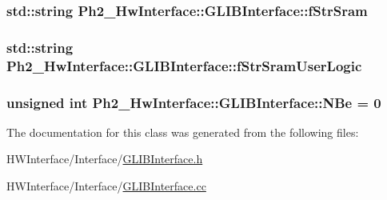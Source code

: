 \hypertarget{class_ph2___hw_interface_1_1_g_l_i_b_interface_ac9b1a3d2dd2e8fc4e12f13ed8f985699}{
\subsubsection[{f\-Str\-Sram}]{\setlength{\rightskip}{0pt plus 5cm}std\-::string Ph2\-\_\-\-Hw\-Interface\-::\-G\-L\-I\-B\-Interface\-::f\-Str\-Sram\hspace{0.3cm}{\ttfamily [private]}}}\label{class_ph2___hw_interface_1_1_g_l_i_b_interface_ac9b1a3d2dd2e8fc4e12f13ed8f985699}
\hypertarget{class_ph2___hw_interface_1_1_g_l_i_b_interface_ae8df09ba9b0b3e6ef079d9881f31f2c0}{
\subsubsection[{f\-Str\-Sram\-User\-Logic}]{\setlength{\rightskip}{0pt plus 5cm}std\-::string Ph2\-\_\-\-Hw\-Interface\-::\-G\-L\-I\-B\-Interface\-::f\-Str\-Sram\-User\-Logic\hspace{0.3cm}{\ttfamily [private]}}}\label{class_ph2___hw_interface_1_1_g_l_i_b_interface_ae8df09ba9b0b3e6ef079d9881f31f2c0}
\hypertarget{class_ph2___hw_interface_1_1_g_l_i_b_interface_a85f9c804b41b8eb7b4d81f7307b5bc4a}{
\subsubsection[{N\-Be}]{\setlength{\rightskip}{0pt plus 5cm}unsigned int Ph2\-\_\-\-Hw\-Interface\-::\-G\-L\-I\-B\-Interface\-::\-N\-Be = 0\hspace{0.3cm}{\ttfamily [static]}}}\label{class_ph2___hw_interface_1_1_g_l_i_b_interface_a85f9c804b41b8eb7b4d81f7307b5bc4a}


The documentation for this class was generated from the following files\-:\begin{DoxyCompactItemize}
\item 
H\-W\-Interface/\-Interface/\hyperlink{_g_l_i_b_interface_8h}{G\-L\-I\-B\-Interface.\-h}\item 
H\-W\-Interface/\-Interface/\hyperlink{_g_l_i_b_interface_8cc}{G\-L\-I\-B\-Interface.\-cc}\end{DoxyCompactItemize}
